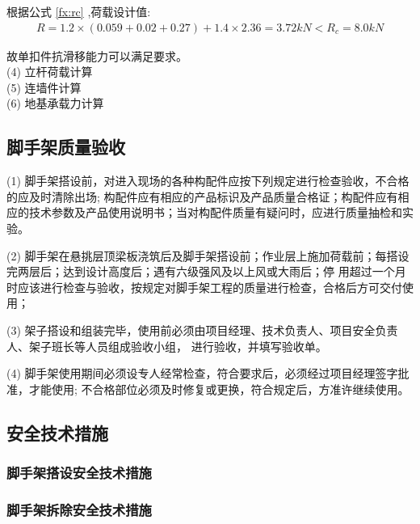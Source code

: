 根据公式 \ref{fx:rc} ,荷载设计值:
\begin{align}
R=1.2×(0.059+0.02+0.27)+1.4×2.36=3.72kN<R_c=8.0kN
\end{align}

故单扣件抗滑移能力可以满足要求。\\

(4) 立杆荷载计算\\

(5) 连墙件计算\\

(6) 地基承载力计算\\

\subsection{脚手架质量验收}

(1) 脚手架搭设前，对进入现场的各种构配件应按下列规定进行检查验收，不合格的应及时清除出场;
构配件应有相应的产品标识及产品质量合格证；构配件应有相应的技术参数及产品使用说明书；当对构配件质量有疑问时，应进行质量抽检和实
验。

(2) 脚手架在悬挑层顶梁板浇筑后及脚手架搭设前；作业层上施加荷载前；每搭设完两层后；达到设计高度后；遇有六级强风及以上风或大雨后；停
用超过一个月时应该进行检查与验收，按规定对脚手架工程的质量进行检查，合格后方可交付使用；

(3) 架子搭设和组装完毕，使用前必须由项目经理、技术负责人、项目安全负责人、架子班长等人员组成验收小组，
进行验收，并填写验收单。

(4) 脚手架使用期间必须设专人经常检查，符合要求后，必须经过项目经理签字批准，才能使用;
不合格部位必须及时修复或更换，符合规定后，方准许继续使用。 

\subsection{安全技术措施}
\subsubsection{脚手架搭设安全技术措施}

\subsubsection{脚手架拆除安全技术措施}
